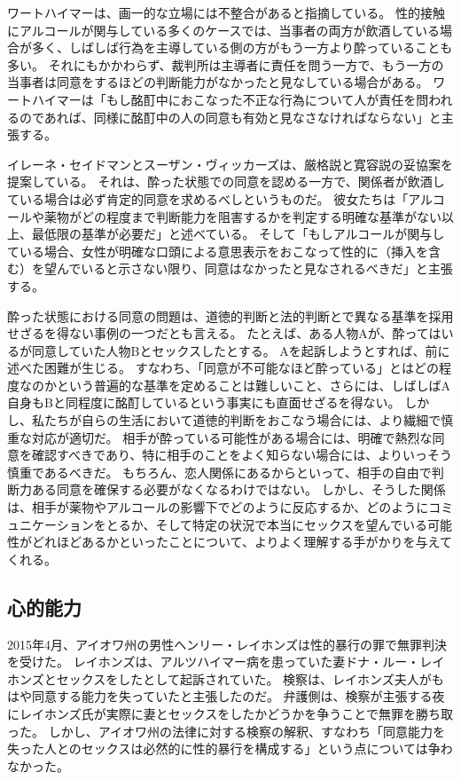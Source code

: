 \documentclass[paper=a4,book,openany]{jlreq}
\begin{document}
ワートハイマーは、画一的な立場には不整合があると指摘している。
性的接触にアルコールが関与している多くのケースでは、当事者の両方が飲酒している場合が多く、しばしば行為を主導している側の方がもう一方より酔っていることも多い。
それにもかかわらず、裁判所は主導者に責任を問う一方で、もう一方の当事者は同意をするほどの判断能力がなかったと見なしている場合がある。
ワートハイマーは「もし酩酊中におこなった不正な行為について人が責任を問われるのであれば、同様に酩酊中の人の同意も有効と見なさなければならない」と主張する\citep[p.233]{wertheimer03:_consen_sexual_relat}。

イレーネ・セイドマンとスーザン・ヴィッカーズは、厳格説と寛容説の妥協案を提案している。
それは、酔った状態での同意を認める一方で、関係者が飲酒している場合は必ず肯定的同意を求めるべしというものだ。
彼女たちは「アルコールや薬物がどの程度まで判断能力を阻害するかを判定する明確な基準がない以上、最低限の基準が必要だ」と述べている。
そして「もしアルコールが関与している場合、女性が明確な口頭による意思表示をおこなって性的に（挿入を含む）を望んでいると示さない限り、同意はなかったと見なされるべきだ」と主張する\citep[p.486]{seidman05:_secon_wave}。

酔った状態における同意の問題は、道徳的判断と法的判断とで異なる基準を採用せざるを得ない事例の一つだとも言える。
たとえば、ある人物Aが、酔ってはいるが同意していた人物Bとセックスしたとする。
Aを起訴しようとすれば、前に述べた困難が生じる。
すなわち、「同意が不可能なほど酔っている」とはどの程度なのかという普遍的な基準を定めることは難しいこと、さらには、しばしばA自身もBと同程度に酩酊しているという事実にも直面せざるを得ない。
しかし、私たちが自らの生活において道徳的判断をおこなう場合には、より繊細で慎重な対応が適切だ。
相手が酔っている可能性がある場合には、明確で熱烈な同意を確認すべきであり、特に相手のことをよく知らない場合には、よりいっそう慎重であるべきだ。
もちろん、恋人関係にあるからといって、相手の自由で判断力ある同意を確保する必要がなくなるわけではない。
しかし、そうした関係は、相手が薬物やアルコールの影響下でどのように反応するか、どのようにコミュニケーションをとるか、そして特定の状況で本当にセックスを望んでいる可能性がどれほどあるかといったことについて、よりよく理解する手がかりを与えてくれる。

\subsection{心的能力}

2015年4月、アイオワ州の男性ヘンリー・レイホンズは性的暴行の罪で無罪判決を受けた。
レイホンズは、アルツハイマー病を患っていた妻ドナ・ルー・レイホンズとセックスをしたとして起訴されていた。
検察は、レイホンズ夫人がもはや同意する能力を失っていたと主張したのだ。
弁護側は、検察が主張する夜にレイホンズ氏が実際に妻とセックスをしたかどうかを争うことで無罪を勝ち取った。
しかし、アイオワ州の法律に対する検察の解釈、すなわち「同意能力を失った人とのセックスは必然的に性的暴行を構成する」という点については争わなかった\citep{belluck15:_sex_demen_husban_trial_age}。
\end{document}
